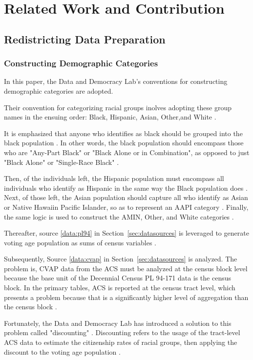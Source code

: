 \documentclass[sn-vancouver,Numbered]{sn-jnl}
\theoremstyle{thmstyleone}%
\theoremstyle{thmstyletwo}%
\theoremstyle{thmstylethree}%
\begin{document}
\section{Related Work and Contribution}\label{sec2}
\subsection{Redistricting Data Preparation}
\subsubsection{Constructing Demographic Categories}
In this paper, the Data and Democracy Lab's conventions for constructing demographic categories are adopted. 

Their convention for categorizing racial groups inolves adopting these group names in the ensuing order: Black, Hispanic, Asian, Other,and White \cite{mggg_vap_cvap}. 

It is emphasized that anyone who identifies as black should be grouped into the black population \cite{mggg_vap_cvap}. In other words, the black population should encompass those who are "Any-Part Black" or "Black Alone or in Combination", as opposed to just "Black Alone" or "Single-Race Black" \cite{mggg_vap_cvap}. 

Then, of the individuals left, the Hispanic population must encompass all individuals who identify as Hispanic in the same way the Black population does \cite{mggg_vap_cvap}. Next, of those left, the Asian population should capture all who identify as Asian or Native Hawaiin Pacific Islander, so as to represent an AAPI category \cite{mggg_vap_cvap}. Finally, the same logic is used to construct the AMIN, Other, and White categories \cite{mggg_vap_cvap}.

Thereafter, source \ref{data:pl94} in Section~\ref{sec:datasources} is leveraged to generate voting age population as sums of census variables \cite{mggg_vap_cvap}.

Subsequently, Source \ref{data:cvap} in Section~\ref{sec:datasources} is analyzed. The problem is, CVAP data from the ACS must be analyzed at the census block level because the base unit of the Decennial Census PL 94-171 data is the census block. In the primary tables, ACS is reported at the census tract level, which presents a problem because that is a significantly higher level of aggregation than the census block \cite{mggg_vap_cvap}.

Fortunately, the Data and Democracy Lab has introduced a solution to this problem called "discounting" \cite{mggg_vap_cvap}. Discounting refers to the usage of the tract-level ACS data to estimate the citizenship rates of racial groups, then applying the discount to the voting age population \cite{mggg_vap_cvap}.
\end{document}
